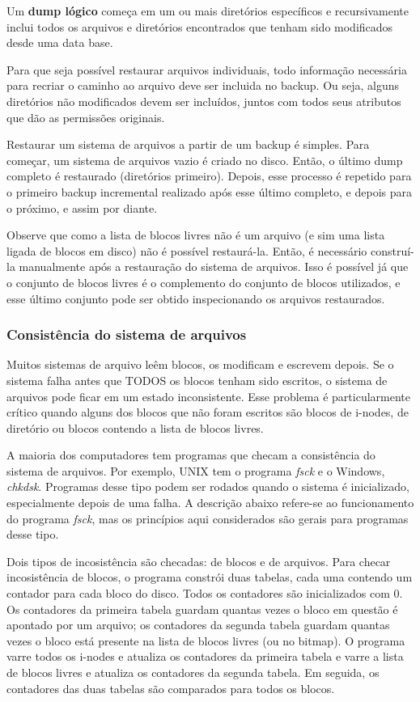 \documentclass{article}
\newcommand\unix{{\color{red}UNIX} }
\begin{document}
Um \textbf{dump lógico} começa em um ou mais diretórios específicos e recursivamente inclui todos os arquivos e diretórios encontrados que tenham sido modificados desde uma data base.

Para que seja possível restaurar arquivos individuais, todo informação necessária para recriar o caminho ao arquivo deve ser incluida no backup. Ou seja, alguns diretórios não modificados devem ser incluídos, juntos com todos seus atributos que dão as permissões originais. 

Restaurar um sistema de arquivos a partir de um backup é simples. Para começar, um sistema de arquivos vazio é criado no disco. Então, o último dump completo é restaurado (diretórios primeiro). Depois, esse processo é repetido para o primeiro backup incremental realizado após esse último completo, e depois para o próximo, e assim por diante.

Observe que como a lista de blocos livres não é um arquivo (e sim uma lista ligada de blocos em disco) não é possível restaurá-la. Então, é necessário construí-la manualmente após a restauração do sistema de arquivos. Isso é possível já que o conjunto de blocos livres é o complemento do conjunto de blocos utilizados, e esse último conjunto pode ser obtido inspecionando os arquivos restaurados.


\subsubsection{Consistência do sistema de arquivos}
Muitos sistemas de arquivo leêm blocos, os modificam e escrevem depois. Se o sistema falha antes que TODOS os blocos tenham sido escritos, o sistema de arquivos pode ficar em um estado inconsistente. Esse problema é particularmente crítico quando alguns dos blocos que não foram escritos são blocos de i-nodes, de diretório ou blocos contendo a lista de blocos livres.

A maioria dos computadores tem programas que checam a consistência do sistema de arquivos. Por exemplo, \unix tem o programa \textit{fsck} e o Windows, \textit{chkdsk}. Programas desse tipo podem ser rodados quando o sistema é inicializado, especialmente depois de uma falha. A descrição abaixo refere-se ao funcionamento do programa \textit{fsck}, mas os princípios aqui considerados são gerais para programas desse tipo.

Dois tipos de incosistência são checadas: de blocos e de arquivos. Para checar incosistência de blocos, o programa constrói duas tabelas, cada uma contendo um contador para cada bloco do disco. Todos os contadores são inicializados com 0. Os contadores da primeira tabela guardam quantas vezes o bloco em questão é apontado por um arquivo; os contadores da segunda tabela guardam quantas vezes o bloco está presente na lista de blocos livres (ou no bitmap). O programa varre todos os i-nodes e atualiza os contadores da primeira tabela e varre a lista de blocos livres e atualiza os contadores da segunda tabela. Em seguida, os contadores das duas tabelas são comparados para todos os blocos.
\end{document}
